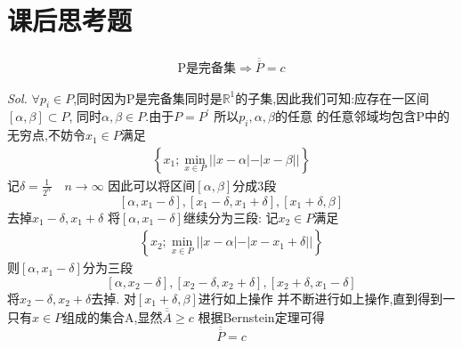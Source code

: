 \section{课后思考题}
\begin{problem}[课上思考题]
        \begin{align}
            \text{P是完备集} \Rightarrow \overline{\overline{P}} = c
        \end{align}
    \end{problem}
    \textit{ Sol. }
        \(\forall p_i \in P\),同时因为P是完备集同时是\(\mathbb{R}^1\)的子集,因此我们可知:应存在一区间\([\alpha , \beta] \subset P\), 同时\(\alpha,\beta \in P \).由于\(P=P^{'}\) 所以\(p_i,\alpha,\beta\)的任意
        的任意邻域均包含P中的无穷点,不妨令\(x_1 \in P \)满足
        \begin{align}\label{1}
            \left\{x_1;\min\limits_{x\in P}||x-\alpha|-|x-\beta|| \right\}
        \end{align}
        记\(\delta=\frac{1}{2^n} \quad n \rightarrow \infty \)
        因此可以将区间\([\alpha,\beta]\)分成3段\[[\alpha, x_1-\delta] , [x_1-\delta,x_1+\delta],[x_1+\delta,\beta]\]
        去掉\(x_1-\delta,x_1+\delta\)
        将\([\alpha,x_1-\delta]\)继续分为三段: 记\(x_2 \in P\)满足
        \begin{align}\label{2}
            \left\{x_2; \min\limits_{x\in P}||x-\alpha|-|x-x_1+\delta||\right\}
        \end{align}
        则\([\alpha,x_1-\delta]\)分为三段 
        \[[\alpha,x_2-\delta] , [x_2-\delta,x_2+\delta],[x_2+\delta,x_1-\delta]\]
        将\(x_2-\delta,x_2+\delta\)去掉.
        对\([x_1+\delta,\beta]\)进行如上操作
        并不断进行如上操作,直到得到一只有\(x\in P\)组成的集合A,显然\(\overline{\overline{A}} \geq c \) 根据Bernstein定理可得 
        \[\overline{\overline{P}}=c\]
